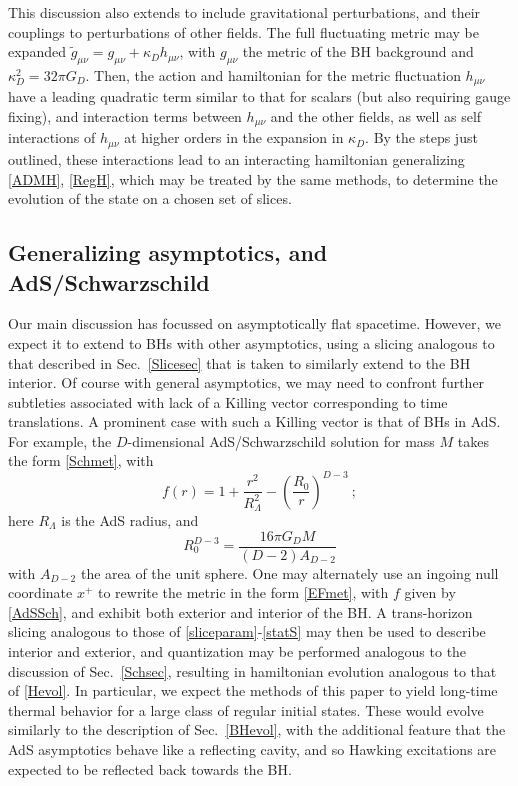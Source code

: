 \documentclass[11pt]{article}
\numberwithin{equation}{section}
\newcommand{\beq}{\begin{equation}}
\newcommand{\eeq}{\end{equation}}
\begin{document}
This discussion also extends to include gravitational perturbations, and their couplings to perturbations of other fields.  The full fluctuating metric may be expanded $\tilde g_{\mu\nu} = g_{\mu\nu}+ \kappa_D h_{\mu\nu}$, with $g_{\mu\nu}$ the metric of the BH background and $\kappa_D^2 =32\pi G_D$.  Then, the action and hamiltonian for the metric fluctuation $h_{\mu\nu}$ have a leading quadratic term similar to that for scalars (but also requiring gauge fixing), and interaction terms between $h_{\mu\nu}$ and the other fields, as well as self interactions of $h_{\mu\nu}$ at higher orders in the expansion in $\kappa_D$.  By the steps just outlined, these interactions lead to an interacting hamiltonian generalizing \eqref{ADMH},  \eqref{RegH}, which may be treated by the same methods, to determine the evolution of the state on a chosen set of slices.  

\subsection{Generalizing asymptotics, and AdS/Schwarzschild}

Our main discussion has focussed on asymptotically flat spacetime.  However, we expect it to extend to BHs with other asymptotics, using a slicing analogous to that described in Sec.~\ref{Slicesec} that is taken to similarly extend to the BH interior.  Of course with general asymptotics, we may need to confront further subtleties associated with lack of a Killing vector corresponding to time translations.  A prominent case with such a Killing vector is that of BHs in AdS.  For example, the $D$-dimensional AdS/Schwarzschild solution for mass $M$ takes the form \eqref{Schmet}, with
\beq\label{AdSSch}
f(r) = 1 + \frac{r^2}{R_\Lambda^2} - \left(\frac{R_0}{r}\right)^{D-3}\ ;
\eeq
here $R_\Lambda$ is the AdS radius, and 
\beq
R_0^{D-3} = \frac{16\pi G_D M}{(D-2)A_{D-2}}
\eeq
with $A_{D-2}$ the area of the unit sphere.  One may alternately use an ingoing null coordinate $x^+$ to rewrite the metric in the form \eqref{EFmet}, with $f$ given by \eqref{AdSSch}, and exhibit both exterior and interior of the BH.  A trans-horizon slicing analogous to those of \eqref{sliceparam}-\eqref{statS} may then be used to describe interior and exterior, and quantization may be performed analogous to the discussion of Sec.~\ref{Schsec}, resulting in  hamiltonian evolution analogous to that of \eqref{Hevol}.  In particular, we expect the methods of this paper to yield long-time thermal behavior for a large class of regular initial states.  These would evolve similarly to the description of  Sec.~\ref{BHevol}, with the additional feature that the AdS asymptotics behave like a reflecting cavity, and so Hawking excitations are expected to be reflected back towards the BH.  
\end{document}

